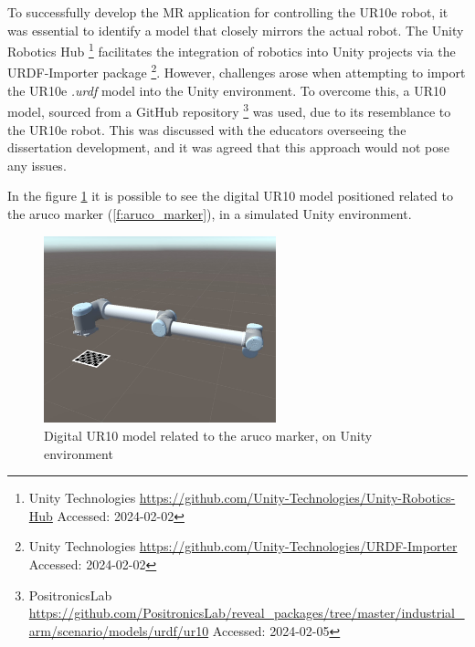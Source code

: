     To successfully develop the \ac{MR} application for controlling the UR10e robot, it was essential to identify a model that closely mirrors 
    the actual robot. The Unity Robotics Hub \footnote{Unity Technologies \url{https://github.com/Unity-Technologies/Unity-Robotics-Hub} 
    Accessed: 2024-02-02} facilitates the integration of robotics into Unity projects via the URDF-Importer package 
    \footnote{Unity Technologies \url{https://github.com/Unity-Technologies/URDF-Importer} Accessed: 2024-02-02}. 
    However, challenges arose when attempting to import the UR10e \textit{.urdf} model into the Unity environment. To overcome this, 
    a UR10 model, sourced from a GitHub repository \footnote{PositronicsLab \url{https://github.com/PositronicsLab/reveal_packages/tree/master/industrial_arm/scenario/models/urdf/ur10} Accessed: 2024-02-05} 
    was used, due to its resemblance to the UR10e robot. This was discussed with the educators overseeing the dissertation development, 
    and it was agreed that this approach would not pose any issues.

    In the figure \ref{f:ur10_marker_unity} it is possible to see the digital UR10 model positioned related to the aruco marker 
    (\ref{f:aruco_marker}), in a simulated Unity environment.
    \begin{figure}[h]
    \centering
    \includegraphics[width=0.6\textwidth]{figs/robot_marker_unity.jpg}
    \caption{Digital UR10 model related to the aruco marker, on Unity environment}
    \label{f:ur10_marker_unity}
    \end{figure}



